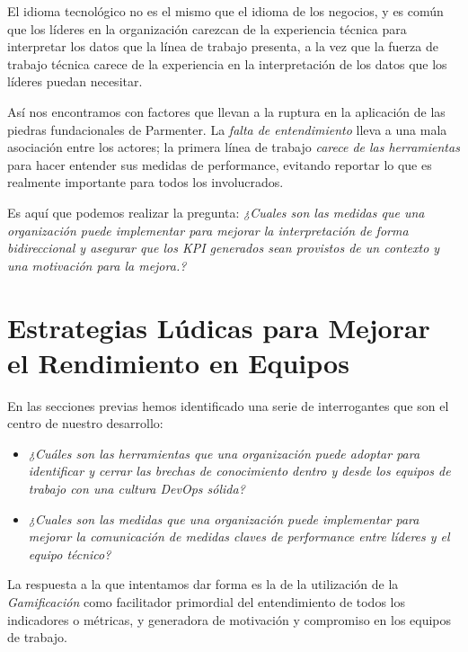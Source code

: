 \documentclass[journal]{IEEEtran}
\begin{document}
El idioma tecnológico no es el mismo que el idioma de los negocios, y es común que los líderes en la organización carezcan de la experiencia técnica para interpretar los datos que la línea de trabajo presenta, a la vez que la fuerza de trabajo técnica carece de la experiencia en la interpretación de los datos que los líderes puedan necesitar.

Así nos encontramos con factores que llevan a la ruptura en la aplicación de las piedras fundacionales de Parmenter. La \textit{falta de entendimiento} lleva a una mala asociación entre los actores; la primera línea de trabajo \textit{carece de las herramientas} para hacer entender sus medidas de performance, evitando reportar lo que es realmente importante para todos los involucrados.

Es aquí que podemos realizar la pregunta: \textit{¿Cuales son las medidas que una organización puede implementar para mejorar la interpretación de forma bidireccional y asegurar que los \textit{KPI} generados sean provistos de un contexto y una motivación para la mejora\cite[Chapter 1. Key Performance Indicators]{parmenter2015key}.?}

\section{\textbf{\Large Estrategias Lúdicas para Mejorar el Rendimiento en Equipos}}

En las secciones previas hemos identificado una serie de interrogantes que son el centro de nuestro desarrollo:

\begin{itemize}
    \item \textit{¿Cuáles son las herramientas que una organización puede adoptar para identificar y cerrar las brechas de conocimiento dentro y desde los equipos de trabajo con una cultura DevOps sólida?}
    \item \textit{¿Cuales son las medidas que una organización puede implementar para mejorar la comunicación de medidas claves de performance entre líderes y el equipo técnico?}
\end{itemize}

La respuesta a la que intentamos dar forma es la de la utilización de la \textit{Gamificación} como facilitador primordial del entendimiento de todos los indicadores o métricas, y generadora de motivación y compromiso en los equipos de trabajo.
\end{document}
